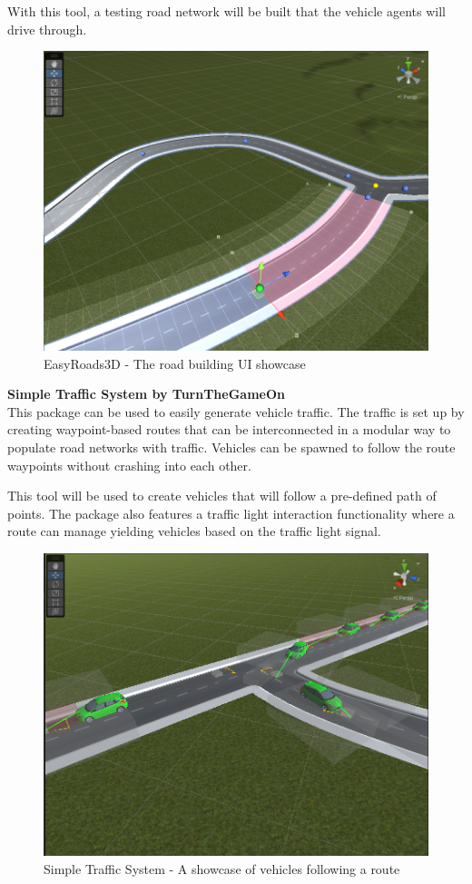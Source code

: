 \documentclass[main.tex]{subfiles}
\begin{document}
With this tool, a testing road network will be built that the vehicle agents will drive through.

\begin{figure}[htbp]
    \centering
    \includegraphics[width=.8\textwidth]{easy-roads.png}
    \caption{EasyRoads3D - The road building UI showcase}
    \label{fig-easyroads}
\end{figure}

\textbf{Simple Traffic System by TurnTheGameOn} \smallskip \\
This package can be used to easily generate vehicle traffic. The traffic is set up by creating
waypoint-based routes that can be interconnected in a modular way to populate road networks
with traffic. Vehicles can be spawned to follow the route waypoints without crashing into each
other.

This tool will be used to create vehicles that will follow a pre-defined path of points. 
The package also features a traffic light interaction functionality where a route can manage
yielding vehicles based on the traffic light signal. 

\begin{figure}[htbp]
    \centering
    \includegraphics[width=.8\textwidth]{simple-traffic-system.png} 
    \caption{Simple Traffic System - A showcase of vehicles following a route}
    \label{fig-sts}
\end{figure}
\end{document}

